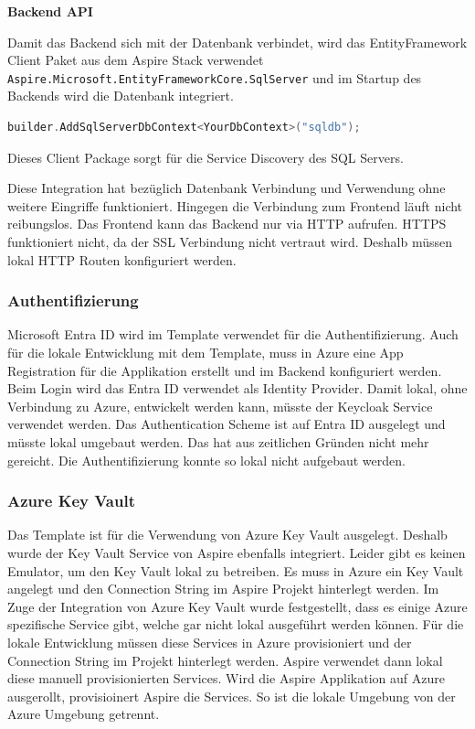             \textbf{Backend API}

            Damit das Backend sich mit der Datenbank verbindet, wird das EntityFramework Client Paket aus dem Aspire Stack verwendet
            \verb|Aspire.Microsoft.EntityFrameworkCore.SqlServer|
            und im Startup des Backends wird die Datenbank integriert.
            
            \begin{lstlisting}[language=C, caption=Einbindung von Entity Framework mit Service Discovery für Aspire Apps]
builder.AddSqlServerDbContext<YourDbContext>("sqldb");
            \end{lstlisting}

            Dieses Client Package sorgt für die Service Discovery des SQL Servers.

            Diese Integration hat bezüglich Datenbank Verbindung und Verwendung ohne weitere Eingriffe funktioniert. Hingegen die Verbindung zum Frontend läuft nicht reibungslos. Das Frontend kann das Backend nur via HTTP aufrufen. HTTPS funktioniert nicht, da der SSL Verbindung nicht vertraut wird. Deshalb müssen lokal HTTP Routen konfiguriert werden.

        \subsubsection{Authentifizierung}

            Microsoft Entra ID wird im Template verwendet für die Authentifizierung. Auch für die lokale Entwicklung mit dem Template, muss in Azure eine App Registration für die Applikation erstellt und im Backend konfiguriert werden. Beim Login wird das Entra ID verwendet als Identity Provider. Damit lokal, ohne Verbindung zu Azure, entwickelt werden kann, müsste der Keycloak Service verwendet werden. Das Authentication Scheme ist auf Entra ID ausgelegt und müsste lokal umgebaut werden. Das hat aus zeitlichen Gründen nicht mehr gereicht. Die Authentifizierung konnte so lokal nicht aufgebaut werden.

        \subsubsection{Azure Key Vault}

            Das Template ist für die Verwendung von Azure Key Vault ausgelegt. Deshalb wurde der Key Vault Service von Aspire ebenfalls integriert. Leider gibt es keinen Emulator, um den Key Vault lokal zu betreiben. Es muss in Azure ein Key Vault angelegt und den Connection String im Aspire Projekt hinterlegt werden. Im Zuge der Integration von Azure Key Vault wurde festgestellt, dass es einige Azure spezifische Service gibt, welche gar nicht lokal ausgeführt werden können. Für die lokale Entwicklung müssen diese Services in Azure provisioniert und der Connection String im Projekt hinterlegt werden. Aspire verwendet dann lokal diese manuell provisionierten Services. Wird die Aspire Applikation auf Azure ausgerollt, provisioinert Aspire die Services. So ist die lokale Umgebung von der Azure Umgebung getrennt.

